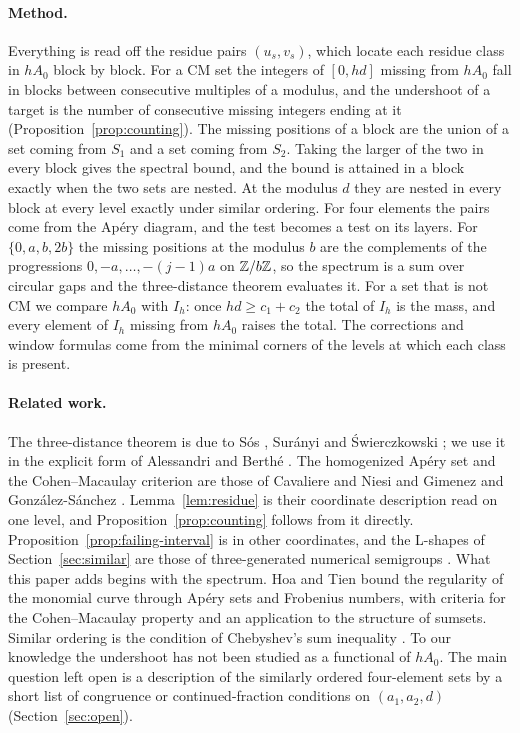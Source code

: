 \paragraph{Method.} Everything is read off the residue pairs $(u_s,v_s)$, which locate each residue class in $hA_0$ block by block. For a CM set the integers of $[0,hd]$ missing from $hA_0$ fall in blocks between consecutive multiples of a modulus, and the undershoot of a target is the number of consecutive missing integers ending at it (Proposition~\ref{prop:counting}). The missing positions of a block are the union of a set coming from $S_1$ and a set coming from $S_2$. Taking the larger of the two in every block gives the spectral bound, and the bound is attained in a block exactly when the two sets are nested. At the modulus $d$ they are nested in every block at every level exactly under similar ordering. For four elements the pairs come from the Ap\'ery diagram, and the test becomes a test on its layers. For $\{0,a,b,2b\}$ the missing positions at the modulus $b$ are the complements of the progressions $0,-a,\dots,-(j-1)a$ on $\mathbb{Z}/b\mathbb{Z}$, so the spectrum is a sum over circular gaps and the three-distance theorem evaluates it. For a set that is not CM we compare $hA_0$ with $I_h$: once $hd\ge c_1+c_2$ the total of $I_h$ is the mass, and every element of $I_h$ missing from $hA_0$ raises the total. The corrections and window formulas come from the minimal corners of the levels at which each class is present.

\paragraph{Related work.} The three-distance theorem is due to S\'os \cite{Sos1958}, Sur\'anyi \cite{Suranyi1958} and \'Swierczkowski \cite{Swierczkowski1958}; we use it in the explicit form of Alessandri and Berth\'e \cite{AlessandriBerthe1998}. The homogenized Ap\'ery set and the Cohen--Macaulay criterion are those of Cavaliere and Niesi \cite{CavaliereNiesi1983} and Gimenez and Gonz\'alez-S\'anchez \cite{GimenezGonzalezSanchez2023}. Lemma~\ref{lem:residue} is their coordinate description read on one level, and Proposition~\ref{prop:counting} follows from it directly. Proposition~\ref{prop:failing-interval} is \cite[Lemma~2.5]{CompanionRegularity} in other coordinates, and the L-shapes of Section~\ref{sec:similar} are those of three-generated numerical semigroups \cite{AguiloMarijuan2014}. What this paper adds begins with the spectrum. Hoa and Tien \cite{HoaTien2026} bound the regularity of the monomial curve through Ap\'ery sets and Frobenius numbers, with criteria for the Cohen--Macaulay property and an application to the structure of sumsets. Similar ordering is the condition of Chebyshev's sum inequality \cite{HardyLittlewoodPolya1952}. To our knowledge the undershoot has not been studied as a functional of $hA_0$. The main question left open is a description of the similarly ordered four-element sets by a short list of congruence or continued-fraction conditions on $(a_1,a_2,d)$ (Section~\ref{sec:open}).


